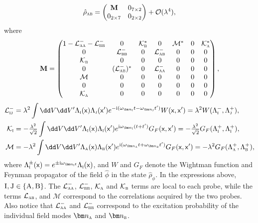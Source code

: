 \documentclass[letterpaper,12pt,titlepage,oneside,final]{book}
\newcommand{\mf}{\mathsf}%
\newcommand{\ii}{\mathrm{i}}
\renewcommand{\r}{\hat{\rho}}
\newcommand{\tc}[1]{\textsc{#1}}
\begin{document}
\begin{align}\label{eq:rhoAB}
    \r_\tc{ab} = \begin{pmatrix} {\text{\textbf{M}}} & 0_{7\times2} \\ 0_{2\times7} & 0_{2\times2}
\end{pmatrix} +\mathcal{O}(\lambda^4),  
\end{align} 
where
\begin{align}
\text{\textbf{M}} = \begin{pmatrix}
       1- \mathcal{L}_\tc{aa}^- - \mathcal{L}_\tc{bb}^-  & 0 & \mathcal{K}_\tc{b}^* & 0 & \mathcal{M}^* & 0 & \mathcal{K}_{\tc{a}}^*\\
        0 & \mathcal{L}_{\textsc{bb}}^- & 0 & \mathcal{L}_{\textsc{ab}}^- & 0& 0& 0\\
        \mathcal{K}_\tc{b} & 0 & 0 & 0 & 0 & 0& 0\\
        0 & (\mathcal{L}_{\textsc{ab}}^-)^*  & 0 & \mathcal{L}_{\textsc{aa}}^-  & 0& 0& 0\\
        \mathcal{M} & 0 & 0 & 0 & 0& 0& 0\\
        0 & 0 & 0 & 0 & 0& 0& 0\\
        \mathcal{K}_{\tc{a}} & 0 & 0 & 0 & 0& 0 & 0
    \end{pmatrix},
\end{align}
\begin{align}
    \mathcal{L}_{\tc{ij}}^- &= \lambda^2 \int \dd V \dd V' \Lambda_\tc{i}(\mf x) \Lambda_\tc{j}(\mf x') e^{- \ii (\omega_{\bm n_\tc{i}} t-\omega_{\bm n_\tc{j}}t')} W(\mf x,\mf x') = \lambda^2 W(\Lambda_\tc{i}^-,\Lambda_\tc{j}^+),\label{eq:Lij}\\
    \mathcal{K}_{\tc{i}} &= - \tfrac{\lambda^2}{\sqrt{2}} \int \dd V \dd V' \Lambda_\tc{i}(\mf x) \Lambda_\tc{i}(\mf x') e^{\ii \omega_{\bm n_\tc{i}}(t+t')} G_F(\mf x,\mf x') = - \tfrac{\lambda^2}{\sqrt{2}} G_F(\Lambda_\tc{i}^+,\Lambda_\tc{i}^+),\label{eq:Kij}\\
    \mathcal{M} &= -\lambda^2 \int \dd V \dd V' \Lambda_\tc{a}(\mf x) \Lambda_\tc{b}(\mf x') e^{\ii (\omega_{\bm n_\tc{a}}t+\omega_{\bm n_\tc{b}}t')} G_F(\mf x,\mf x') = -\lambda^2G_F(\Lambda_\tc{a}^+,\Lambda_\tc{b}^+) ,\label{eq:M}
\end{align}
where $\Lambda_\tc{i}^\pm (\mf x) = e^{\pm \ii \omega_{\bm n_\tc{i}t}}\Lambda_\tc{i}(\mf x)$, and $W$ and $G_F$ denote the Wightman function and Feynman propagator of the field $\hat{\phi}$ in the state $\hat{\rho}_\phi$. In the expressions above, $\tc{I},\tc{J} \in \{\tc{A},\tc{B}\}$. The $\mathcal{L}_\tc{aa}^-$, $\mathcal{L}_\tc{bb}^-$, $\mathcal{K}_\tc{a}$ and $\mathcal{K}_\tc{b}$ terms are local to each probe, while the terms $\mathcal{L}_{\tc{ab}}$, and $\mathcal{M}$ correspond to the correlations acquired by the two probes. Also notice that $\mathcal{L}_{\tc{aa}}^-$ and $\mathcal{L}_{\tc{bb}}^-$ correspond to the excitation probability of the individual field modes $\bm n_\tc{a}$ and $\bm n_\tc{b}$.
\end{document}
